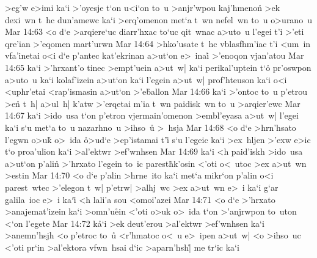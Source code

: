 >eg'w
e>imi
ka`i
>'oyesje
t`on
u<i`on
to~u
>anjr'wpou
kaj'hmenon\r{}
>ek
dexi~wn
t~hc
dun'amewc
ka`i
>erq'omenon
met`a
t~wn
nefel~wn
to~u
o>urano~u\bibvsend
\vs Mar 14:63
<o
d`e
>arqiere`uc
diarr'hxac
to`uc
qit~wnac
a>uto~u
l'egei
t'i
>'eti
qre'ian
>'eqomen
mart'urwn\bibvsend
\vs Mar 14:64
>hko'usate
t~hc
vblasfhm'iac
t'i
<um~in
vfa'inetai
o<i
d`e
p'antec
kat'ekrinan
a>ut`on
e>~inai\r{}
>'enoqon
vjan'atou\bibvsend
\vs Mar 14:65
ka`i
>'hrxant'o
tinec
>empt'uein
a>ut~w|
ka`i
perikal'uptein
t`o\r{}
pr'oswpon
a>uto~u
ka`i
kolaf'izein
a>ut`on
ka`i
l'egein
a>ut~w|
prof'hteuson
ka`i
o<i
<uphr'etai
<rap'ismasin
a>ut`on
>'e\r{b}allon\bibvsend
{}
\vs Mar 14:66
ka`i
>'ontoc
to~u
p'etrou
>en\r{}
t~h|
a>ul~h|
k'atw
>'erqetai
m'ia
t~wn
paidisk~wn
to~u
>arqier'ewc\bibvsend
\vs Mar 14:67
ka`i
>ido~usa
t`on
p'etron
vjermain'omenon
>embl'eyasa
a>ut~w|
l'egei
ka`i
s`u
met`a
to~u
nazarhno~u
>ihso~u\r{}
>~hsja\bibvsend
\vs Mar 14:68
<o
d`e
>hrn'hsato
l'egwn
o>u\r{k}
o>~ida
\r{o}>ud`e
>ep'istamai
t'i\r{}
s`u
l'egeic
ka`i
>ex~hljen
>'exw
e>ic
t`o
proa'ulion
ka`i
>al'ektwr
>ef'wnhsen\bibvsend
\vs Mar 14:69
ka`i
<h
paid'iskh
>ido~usa
a>ut`on
p'alin\r{}
>'hrxato
l'egein
to~ic
parest\r{h}k'osin
<'oti
o<~utoc
>ex
a>ut~wn
>estin\bibvsend
\vs Mar 14:70
<o
d`e
p'alin
>hrne~ito
ka`i
met`a
mikr`on
p'alin
o<i
parest~wtec
>'elegon
t~w|
p'etrw|
>alhj~wc
>ex
a>ut~wn
e>~i
ka`i
g`ar
galila~ioc
e>~i
ka`i\r{}
<h
lali'a
sou
<omoi'azei\bibvsend
\vs Mar 14:71
<o
d`e
>'hrxato
>anajemat'izein
ka`i
>omn'u\r{e}in
<'oti
o>uk
o>~ida
t`on
>'anjrwpon
to~uton
<`on
l'egete\bibvsend
\vs Mar 14:72
k\r{a}`i
>ek
deut'erou
>al'ektwr
>ef'wnhsen
ka`i
>anemn'hsjh
<o
p'etroc
to~u\r{}
<r'hmatoc
o<~u
e>~ipen
a>ut~w|
<o
>ihso~uc
<'oti
pr`in
>al'ektora
vfwn~hsai
d`ic
>aparn'hsh|\r{}
me
tr`ic
ka`i
